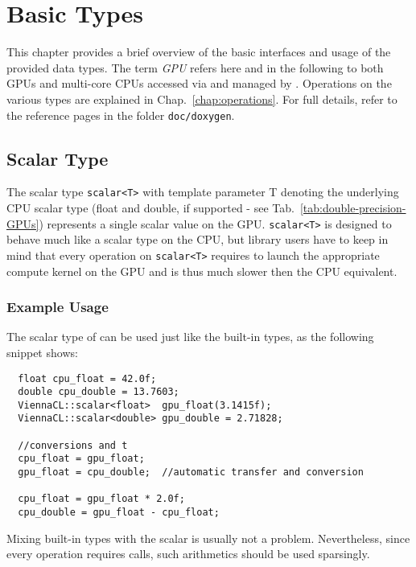 \chapter{Basic Types}
This chapter provides a brief overview of the basic interfaces and usage of the
provided data types. The term \textit{GPU} refers here and in the following to
both GPUs and multi-core CPUs accessed via {\OpenCL} and managed by
{\ViennaCL}. Operations on the various types are explained in
Chap.~\ref{chap:operations}. For full details, refer to the reference pages
in the folder
\texttt{doc/doxygen}.

\section {Scalar Type}
The scalar type \lstinline|scalar<T>| with template parameter T
denoting the underlying CPU scalar type (float and double, if supported - see Tab.~\ref{tab:double-precision-GPUs}) represents a
single scalar value on the GPU. \lstinline|scalar<T>| is designed to behave much
like a scalar type on the CPU, but library users have to keep in mind that
every operation on \lstinline|scalar<T>| requires to launch the appropriate
compute kernel on the GPU and is thus much slower then the CPU equivalent.


\subsection{Example Usage}
The scalar type of {\ViennaCL} can be used just like the built-in
types, as the following snippet shows:
\begin{lstlisting}
  float cpu_float = 42.0f;
  double cpu_double = 13.7603;
  ViennaCL::scalar<float>  gpu_float(3.1415f);
  ViennaCL::scalar<double> gpu_double = 2.71828;

  //conversions and t
  cpu_float = gpu_float;  
  gpu_float = cpu_double;  //automatic transfer and conversion

  cpu_float = gpu_float * 2.0f; 
  cpu_double = gpu_float - cpu_float;
\end{lstlisting}
Mixing built-in types with the {\ViennaCL} scalar is usually not a
problem. Nevertheless, since every operation requires {\OpenCL} calls, such
arithmetics should be used sparsingly.

